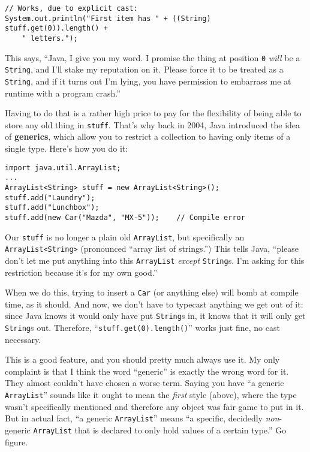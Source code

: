 \begin{Verbatim}[fontsize=\small,samepage=true]
// Works, due to explicit cast:
System.out.println("First item has " + ((String) stuff.get(0)).length() +
    " letters.");
\end{Verbatim}

This says, ``Java, I give you my word. I promise the thing at position
\texttt{0} \textit{will} be a \texttt{String}, and I'll stake my reputation on
it. Please force it to be treated as a \texttt{String}, and if it turns out
I'm lying, you have permission to embarrass me at runtime with a program
crash.''

Having to do that is a rather high price to pay for the flexibility of being
able to store any old thing in \texttt{stuff}. That's why back in 2004, Java
introduced the idea of \textbf{generics}, which allow you to restrict a
collection to having only items of a single type. Here's how you do it:

\begin{Verbatim}[fontsize=\small,samepage=true]
import java.util.ArrayList;
...
ArrayList<String> stuff = new ArrayList<String>();
stuff.add("Laundry");
stuff.add("Lunchbox");
stuff.add(new Car("Mazda", "MX-5"));    // Compile error
\end{Verbatim}

Our \texttt{stuff} is no longer a plain old \texttt{ArrayList}, but
specifically an \texttt{ArrayList<String>} (pronounced ``array list of
strings.'') This tells Java, ``please don't let me put anything into this
\texttt{ArrayList} \textit{except} \texttt{String}s. I'm asking for this
restriction because it's for my own good.''

When we do this, trying to insert a \texttt{Car} (or anything else) will bomb
at compile time, as it should. And now, we don't have to typecast anything we
get out of it: since Java knows it would only have put \texttt{String}s in, it
knows that it will only get \texttt{String}s out. Therefore,
``\texttt{stuff.get(0).length()}'' works just fine, no cast necessary.

This is a good feature, and you should pretty much always use it. My only
complaint is that I think the word ``generic'' is exactly the wrong word for
it. They almost couldn't have chosen a worse term. Saying you have ``a generic
\texttt{ArrayList}'' sounds like it ought to mean the \textit{first} style
(above), where the type wasn't specifically mentioned and therefore any object
was fair game to put in it. But in actual fact, ``a generic
\texttt{ArrayList}'' means ``a specific, decidedly \textit{non}-generic
\texttt{ArrayList} that is declared to only hold values of a certain type.''
Go figure.

